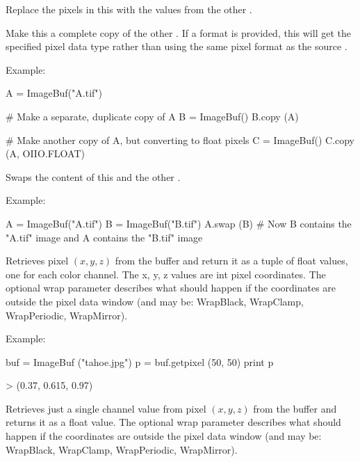 Replace the pixels in this \ImageBuf with the values from the other
\ImageBuf.
\apiend

Make this \ImageBuf a complete copy of the other \ImageBuf.
If a {\cf format} is provided, {\cf this} will get the specified pixel
data type rather than using the same pixel format as the source \ImageBuf.

\noindent Example:
\begin{code}
    A = ImageBuf("A.tif")

    # Make a separate, duplicate copy of A
    B = ImageBuf()
    B.copy (A)

    # Make another copy of A, but converting to float pixels
    C = ImageBuf()
    C.copy (A, OIIO.FLOAT)
\end{code}
\apiend

Swaps the content of this \ImageBuf and the other \ImageBuf.

\noindent Example:
\begin{code}
    A = ImageBuf("A.tif")
    B = ImageBuf("B.tif")
    A.swap (B)
    # Now B contains the "A.tif" image and A contains the "B.tif" image
\end{code}
\apiend

Retrieves pixel $(x,y,z)$ from the buffer and return it as a tuple of
{\cf float} values, one for each color channel.  The {\cf x, y, z} values
are {\cf int} pixel coordinates.  The optional {\cf wrap} parameter
describes what should happen if the coordinates are outside the pixel data
window (and may be: {\cf WrapBlack, WrapClamp, WrapPeriodic, WrapMirror}).

\noindent Example:
\begin{code}
    buf = ImageBuf ("tahoe.jpg")
    p = buf.getpixel (50, 50)
    print p

    > (0.37, 0.615, 0.97)
\end{code}
\apiend

Retrieves just a single channel value from pixel $(x,y,z)$ from the buffer
and returns it as a {\cf float} value.  The optional {\cf wrap} parameter
describes what should happen if the coordinates are outside the pixel data
window (and may be: {\cf WrapBlack, WrapClamp, WrapPeriodic, WrapMirror}).

